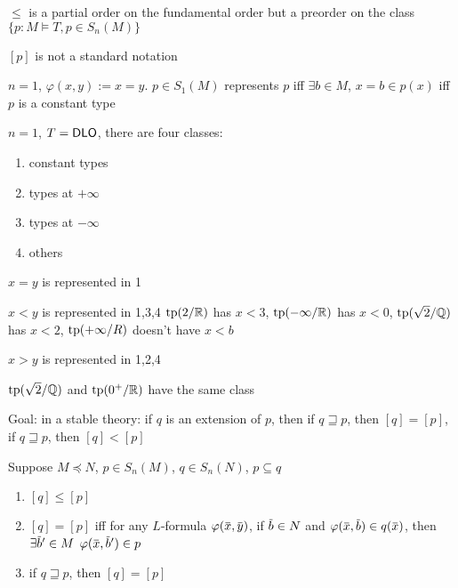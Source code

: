 \documentclass[11pt]{article}
\begin{document}
\begin{remark}
\(\le\) is a partial order on the fundamental order but a preorder on the class \(\{p:M\vDash T,p\in S_n(M)\}\)
\end{remark}

\([p]\) is not a standard notation

\begin{examplle}[]
\(n=1\), \(\varphi(x,y):=x=y\). \(p\in S_1(M)\) represents \(p\) iff \(\exists b\in M\), \(x=b\in p(x)\) iff \(p\)
is a constant type
\end{examplle}

\begin{examplle}[]
\(n=1\), \(T=\operatorname{\textsf{DLO}}\), there are four classes:
\begin{enumerate}
\item constant types
\item types at \(+\infty\)
\item types at \(-\infty\)
\item others
\end{enumerate}


\begin{center}\end{center}

\(x=y\) is represented in 1

\(x<y\) is represented in 1,3,4 \(\operatorname{tp}(2/\mathbb{R})\) has \(x<3\), \(\operatorname{tp}(-\infty/\mathbb{R})\)
has \(x<0\), \(\operatorname{tp}(\sqrt{2}/\mathbb{Q})\) has \(x<2\), \(\operatorname{tp}(+\infty/R)\) doesn't have \(x<b\)

\(x>y\) is represented in 1,2,4

\(\operatorname{tp}(\sqrt{2}/\mathbb{Q})\) and \(\operatorname{tp}(0^+/\mathbb{R})\) have the same class
\end{examplle}

Goal: in a stable theory: if \(q\) is an extension of \(p\), then if \(q\sqsupseteq p\), then \([q]=[p]\),
if \(q\sqsupseteq p\), then \([q]<[p]\)

\begin{proposition}[]
\label{3.31.5}
Suppose \(M\preceq N\), \(p\in S_n(M)\), \(q\in S_n(N)\), \(p\subseteq q\)
\begin{enumerate}
\item \([q]\le[p]\)
\item \([q]=[p]\) iff for any \(L\)-formula \(\varphi(\barx,\bary)\), if \(\barb\in N\)
and \(\varphi(\barx,\barb)\in q(\barx)\), then \(\exists\barb'\in M\) \(\varphi(\barx,\barb')\in p\)
\item if \(q\sqsupseteq p\), then \([q]=[p]\)
\end{enumerate}
\end{proposition}
\end{document}

